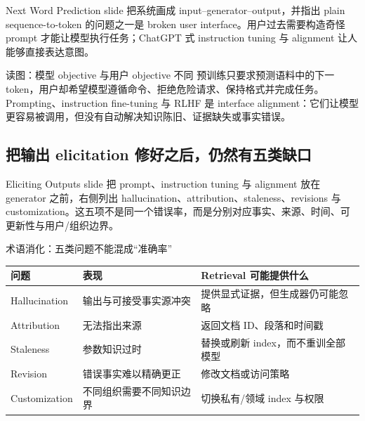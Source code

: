 Next Word Prediction slide 把系统画成 input--generator--output，并指出 plain sequence-to-token 的问题之一是 broken user interface。用户过去需要构造奇怪 prompt 才能让模型执行任务；ChatGPT 式 instruction tuning 与 alignment 让人能够直接表达意图。


\begin{knowledgebox}{读图：模型 objective 与用户 objective 不同}
预训练只要求预测语料中的下一 token，用户却希望模型遵循命令、拒绝危险请求、保持格式并完成任务。Prompting、instruction fine-tuning 与 RLHF 是 interface alignment：它们让模型更容易被调用，但没有自动解决知识陈旧、证据缺失或事实错误。
\end{knowledgebox}


\subsection{把输出 elicitation 修好之后，仍然有五类缺口}

Eliciting Outputs slide 把 prompt、instruction tuning 与 alignment 放在 generator 之前，右侧列出 hallucination、attribution、staleness、revisions 与 customization。这五项不是同一个错误率，而是分别对应事实、来源、时间、可更新性与用户/组织边界。


\begin{knowledgebox}{术语消化：五类问题不能混成“准确率”}
\begin{tabularx}{\textwidth}{L{0.18\textwidth}>{\raggedright\arraybackslash}X >{\raggedright\arraybackslash}X}
\toprule
问题 & 表现 & Retrieval 可能提供什么 \\
\midrule
Hallucination & 输出与可接受事实源冲突 & 提供显式证据，但生成器仍可能忽略 \\
Attribution & 无法指出来源 & 返回文档 ID、段落和时间戳 \\
Staleness & 参数知识过时 & 替换或刷新 index，而不重训全部模型 \\
Revision & 错误事实难以精确更正 & 修改文档或访问策略 \\
Customization & 不同组织需要不同知识边界 & 切换私有/领域 index 与权限 \\
\bottomrule
\end{tabularx}
\end{knowledgebox}

